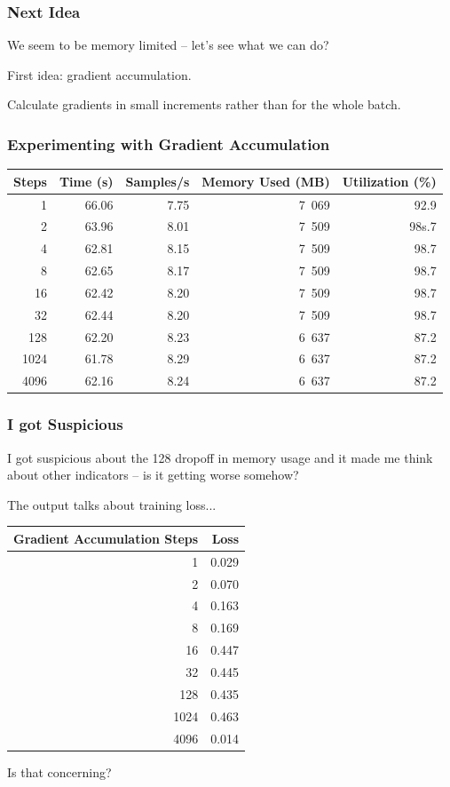 \begin{frame}
\frametitle{Next Idea}

We seem to be memory limited -- let's see what we can do?

First idea: \alert{gradient accumulation}. 

Calculate gradients in small increments rather than for the whole batch.

\end{frame}

\begin{frame}
\frametitle{Experimenting with Gradient Accumulation}

\begin{center}
\begin{tabular}{r|r|r|r|r}
\textbf{Steps} & \textbf{Time (s)} & \textbf{Samples/s} & \textbf{Memory Used (MB)} & \textbf{Utilization (\%)} \\ \hline
1 & 66.06 & 7.75 & 7~069 & 92.9 \\
2 & 63.96 & 8.01 & 7~509 & 98s.7 \\
4 & 62.81 & 8.15 & 7~509 & 98.7 \\
8 & 62.65 & 8.17 & 7~509 & 98.7 \\
16 & 62.42 & 8.20 & 7~509 & 98.7 \\
32 & 62.44 & 8.20 & 7~509 & 98.7\\
128 & 62.20 & 8.23 & 6~637 & 87.2\\
1024 & 61.78 & 8.29 & 6~637 & 87.2 \\
4096 & 62.16 & 8.24 & 6~637 & 87.2
\end{tabular}
\end{center}

\end{frame}

\begin{frame}
\frametitle{I got Suspicious}

I got suspicious about the 128 dropoff in memory usage and it made me think about other indicators -- is it getting worse somehow? 

The output talks about training loss...

\begin{center}
\begin{tabular}{r|r}
\textbf{Gradient Accumulation Steps} & \textbf{Loss} \\ \hline
1 & 0.029 \\
2 & 0.070 \\
4 & 0.163 \\
8 & 0.169 \\
16 & 0.447 \\
32 & 0.445 \\
128 & 0.435 \\
1024 & 0.463 \\
4096 & 0.014 \\
\end{tabular}
\end{center}

Is that concerning?

\end{frame}

